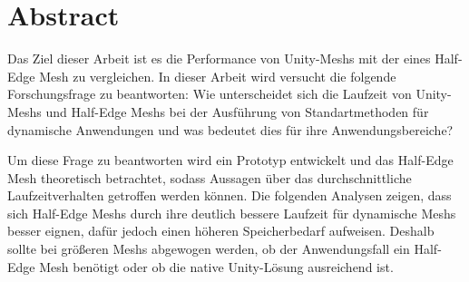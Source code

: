 \section{Abstract}
Das Ziel dieser Arbeit ist es die Performance von Unity-Meshs mit der eines Half-Edge Mesh zu vergleichen. In dieser Arbeit wird versucht die folgende Forschungsfrage zu beantworten: Wie unterscheidet sich die Laufzeit von Unity-Meshs und Half-Edge Meshs bei der Ausf\"uhrung von Standartmethoden f\"ur dynamische Anwendungen und was bedeutet dies f\"ur ihre Anwendungsbereiche?

Um diese Frage zu beantworten wird ein Prototyp entwickelt und das Half-Edge Mesh theoretisch betrachtet, sodass Aussagen \"uber das durchschnittliche Laufzeitverhalten getroffen werden k\"onnen.
Die folgenden Analysen zeigen, dass sich Half-Edge Meshs durch ihre deutlich bessere Laufzeit f\"ur dynamische Meshs besser eignen, daf\"ur jedoch einen h\"oheren Speicherbedarf aufweisen. Deshalb sollte bei gr\"o{\ss}eren Meshs abgewogen werden, ob der Anwendungsfall ein Half-Edge Mesh ben\"otigt oder ob die native Unity-L\"osung ausreichend ist.